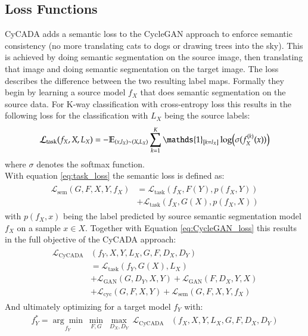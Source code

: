 \subsection{Loss Functions}
CyCADA \cite{DBLP:journals/corr/abs-1711-03213} adds a semantic loss to the CycleGAN approach to enforce semantic consistency (no more translating cats to dogs or drawing trees into the sky). This is achieved by doing semantic segmentation on the source image, then translating that image and doing semantic segmentation on the target image. The loss describes the difference between the two resulting label maps. Formally they begin by learning a source model $f_X$ that does semantic segmentation on the source data. For K-way classification with cross-entropy loss this results in the following loss for the classification with $L_X$ being the source labels:
\begin{align}
	\mathcal{L}_{\text{task}}(f_X, X, L_X) = -\mathbb{E}_{(x, l_X)\sim(X, L_X)}\sum_{k=1}^{K}\mathds{1}_{[k=l_X]}\log\Bigl(\sigma(f_X^{(k)}(x))\Bigr) \label{eq:task_loss} 
\end{align}
where $\sigma$ denotes the softmax function.\\
With equation \ref{eq:task_loss} the semantic loss is defined as:
\begin{align}
	\begin{split}
		\mathcal{L}_{\text{sem}}(G, F, X, Y, f_X) &= \mathcal{L}_{\text{task}}(f_X, F(Y), p(f_X, Y))\\
		&+ \mathcal{L}_{\text{task}}(f_X, G(X), p(f_X, X))
	\end{split}
\end{align}
with $p(f_X, x)$ being the label predicted by source semantic segmentation model $f_X$ on a sample $x \in X$. Together with Equation \ref{eq:CycleGAN_loss} this results in the full objective of the CyCADA approach:
\begin{align}
	\begin{split}
		\mathcal{L}_{\text{CyCADA}}&(f_Y, X, Y, L_X, G, F, D_X, D_Y)\\
		&= \mathcal{L}_{\text{task}}(f_Y, G(X), L_X)\\
		&+ \mathcal{L}_{\text{GAN}}(G, D_Y, X, Y) + \mathcal{L}_{\text{GAN}}(F, D_X, Y, X)\\
		&+ \mathcal{L}_{\text{cyc}}(G, F, X, Y) + \mathcal{L}_{\text{sem}}(G, F, X, Y, f_X)
	\end{split}
\end{align}
And ultimately optimizing for a target model $f_Y$ with:
\begin{align}
	f^*_Y = \underset{f_Y}{\arg\min} ~ \underset{F,G}{\min} ~ \underset{D_X, D_Y}{\max} ~ \mathcal{L}_{\text{CyCADA}}&(f_X, X, Y, L_X, G, F, D_X, D_Y)
\end{align}

